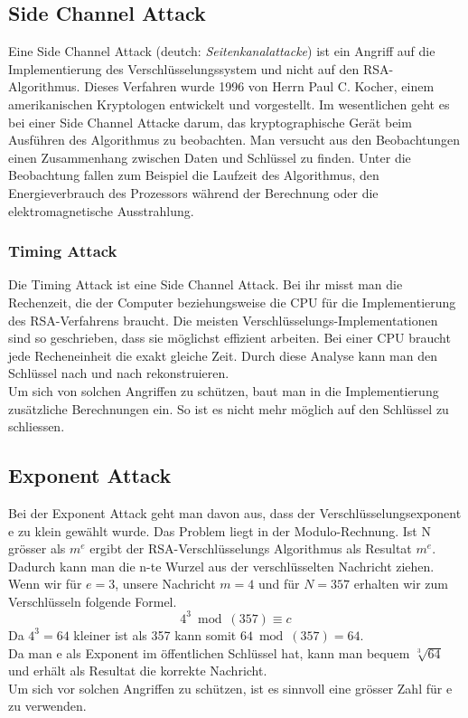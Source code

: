 %
\subsection{Side Channel Attack}
Eine Side Channel Attack (deutch: \textit{Seitenkanalattacke}) ist ein Angriff auf die Implementierung des Verschlüsselungssystem und nicht auf den RSA-Algorithmus. Dieses Verfahren wurde 1996 von Herrn Paul C. Kocher, einem amerikanischen Kryptologen entwickelt und vorgestellt.
Im wesentlichen geht es bei einer Side Channel Attacke darum, das kryptographische Gerät beim Ausführen des Algorithmus zu beobachten.
Man versucht aus den Beobachtungen einen Zusammenhang zwischen Daten und Schlüssel zu finden.
Unter die Beobachtung fallen zum Beispiel die Laufzeit des Algorithmus, den Energieverbrauch des Prozessors während der Berechnung oder die elektromagnetische Ausstrahlung.
%
\subsubsection{Timing Attack}
Die Timing Attack ist eine Side Channel Attack. 
Bei ihr misst man die Rechenzeit, die der Computer beziehungsweise die CPU für die Implementierung des RSA-Verfahrens braucht. Die meisten Verschlüsselungs-Implementationen sind so geschrieben, dass sie möglichst effizient arbeiten. Bei einer CPU braucht jede Recheneinheit die exakt gleiche Zeit. Durch diese Analyse kann man den Schlüssel nach und nach rekonstruieren.\\
%
Um sich von solchen Angriffen zu schützen, baut man in die Implementierung zusätzliche Berechnungen ein. So ist es nicht mehr möglich auf den Schlüssel zu schliessen.
%
%
\subsection{Exponent Attack}
Bei der Exponent Attack geht man davon aus, dass der Verschlüsselungsexponent e zu klein gewählt wurde. Das Problem liegt in der Modulo-Rechnung. Ist N grösser als $m^e$ ergibt der RSA-Verschlüsselungs Algorithmus als Resultat $m^e$. Dadurch kann man die n-te Wurzel aus der verschlüsselten Nachricht ziehen. \\
Wenn wir für $e = 3$, unsere Nachricht $m = 4$ und für $N = 357$ erhalten wir zum Verschlüsseln folgende Formel.
\begin{equation*}
  4^3 \bmod(357) \equiv c
\end{equation*}
Da $4^3 = 64$ kleiner ist als 357 kann somit $64 \bmod(357) = 64$.\\
Da man e als Exponent im öffentlichen Schlüssel hat, kann man bequem $\sqrt[3]{64}$ und erhält als Resultat die korrekte Nachricht.\\
%
Um sich vor solchen Angriffen zu schützen, ist es sinnvoll eine grösser Zahl für e zu verwenden.
